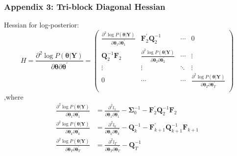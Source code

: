 \documentclass{beamer}
\begin{document}
	\begin{frame}
		\frametitle{Appendix 3: Tri-block Diagonal Hessian}
		Hessian for log-posterior:
		\[H = \frac{\partial^{2}\log{P(\bm{\theta}|\mathbf{Y})}}{\partial\bm{\theta}\partial\bm{\theta}^{'}} = \begin{pmatrix}
			\frac{\partial^{2}\log{P(\bm{\theta}|\bm{Y})}}{\partial\bm{\theta}_{1}\partial\bm{\theta}_{1}^{'}} & \bm{F}_{2}^{'}\bm{Q}_{2}^{-1} & \cdots & 0 \\
			\bm{Q}_{2}^{- 1}\bm{F}_{2} & \frac{\partial^{2}\log{P(\bm{\theta}|\bm{Y})}}{\partial\bm{\theta}_{2}\partial\bm{\theta}_{2}^{'}} & \cdots & \vdots \\
			\vdots & \vdots & \ddots & \vdots \\
			0 & \cdots & \cdots & \frac{\partial^{2}\log{P(\bm{\theta}|\bm{Y})}}{\partial\bm{\theta}_{T}\partial\bm{\theta}_{T}^{'}} \\
		\end{pmatrix}\]
		,where
		\begin{align*}
			\frac{\partial^{2}\log{P(\bm{\theta}|\bm{Y})}}{\partial\bm{\theta}_{1}\partial\bm{\theta}_{1}^{'}} &= \frac{\partial^{2}l_{1}}{\partial\bm{\theta}_{1}\partial\bm{\theta}_{1}^{'}} - \bm{\Sigma}_{0}^{- 1} - \bm{F}_{2}^{'}\bm{Q}_{2}^{- 1}\bm{F}_{2}\\
			\frac{\partial^{2}\log{P(\bm{\theta}|\bm{Y})}}{\partial\bm{\theta}_{k}\partial\bm{\theta}_{k}^{'}} &= \frac{\partial^{2}l_{k}}{\partial\bm{\theta}_{k}\partial\bm{\theta}_{k}^{'}} - \bm{Q}_{k}^{- 1} - \bm{F}_{k+1}^{'}\bm{Q}_{k+1}^{- 1}\bm{F}_{k + 1}\\
			\frac{\partial^{2}\log{P(\bm{\theta}|\bm{Y})}}{\partial\bm{\theta}_{T}\partial\bm{\theta}_{T}^{\bm{'}}} &= \frac{\partial^{2}l_{T}}{\partial\bm{\theta}_{T}\partial\bm{\theta}_{T}^{'}} - \bm{Q}_{T}^{- 1}
		\end{align*}
	\end{frame}
	
\end{document}

